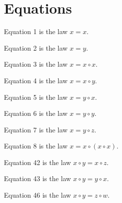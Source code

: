\chapter{Equations}

\begin{definition}[Equation 1]\label{eq1}  Equation 1 is the law $x=x$.
\end{definition}

\begin{definition}[Equation 2]\label{eq2}  Equation 2 is the law $x=y$.
\end{definition}

\begin{definition}[Equation 3]\label{eq3}  Equation 3 is the law $x=x \circ x$.
\end{definition}

\begin{definition}[Equation 4]\label{eq4}  Equation 4 is the law $x=x \circ y$.
\end{definition}

\begin{definition}[Equation 5]\label{eq5}  Equation 5 is the law $x=y \circ x$.
\end{definition}

\begin{definition}[Equation 6]\label{eq6}  Equation 6 is the law $x=y \circ y$.
\end{definition}

\begin{definition}[Equation 7]\label{eq7}  Equation 7 is the law $x=y \circ z$.
\end{definition}

\begin{definition}[Equation 8]\label{eq8}  Equation 8 is the law $x=x \circ (x \circ x)$.
\end{definition}

\begin{definition}[Equation 42]\label{eq42}  Equation 42 is the law $x \circ y = x \circ z$.
\end{definition}

\begin{definition}[Equation 43]\label{eq43}  Equation 43 is the law $x \circ y = y \circ x$.
\end{definition}

\begin{definition}[Equation 46]\label{eq46}  Equation 46 is the law $x \circ y = z \circ w$.
\end{definition}

